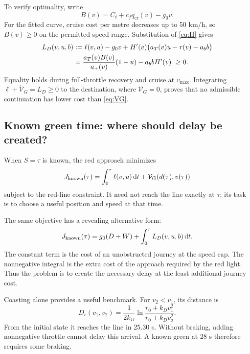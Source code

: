 \documentclass[journal,a4paper,twocolumn]{IEEEtran}
\newcommand{\dd}{\,\mathrm{d}}
\newcommand{\cruise}{\mathrm{cr}}
\begin{document}
To verify optimality, write
\begin{equation}
 B(v)=C_t+c_fq_{\cruise}(v)-g_0v.
\end{equation}
For the fitted curve, cruise cost per metre decreases up to 50 km/h, so $B(v)\ge0$ on the permitted speed range. Substitution of \eqref{eq:H} gives
\begin{align}
 L_D(v,u,b)
 &:=\ell(v,u)-g_0v
 +H'(v)\bigl(a_T(v)u-r(v)-a_bb\bigr)\notag\\
 &=\frac{a_T(v)B(v)}{a_+(v)}(1-u)-a_bbH'(v)
 \ \ge0.
 \label{eq:delayrate}
\end{align}
Equality holds during full-throttle recovery and cruise at $v_{\max}$. Integrating $\ell+\dot{\mathcal V}_G=L_D\ge0$ to the destination, where $\mathcal V_G=0$, proves that no admissible continuation has lower cost than \eqref{eq:VG}.

\subsection{Known green time: where should delay be created?}\label{sec:known}
When $S=\tau$ is known, the red approach minimizes
\begin{equation}
 J_{\rm known}(\tau)=\int_0^\tau\ell(v,u)\dd t
 +\mathcal V_G(d(\tau),v(\tau))
 \label{eq:known}
\end{equation}
subject to the red-line constraint. It need not reach the line exactly at $\tau$; its task is to choose a useful position and speed at that time.

The same objective has a revealing alternative form:
\begin{equation}
 J_{\rm known}(\tau)
 =g_0(D+W)+\int_0^\tau L_D(v,u,b)\dd t.
 \label{eq:knowndelay}
\end{equation}
The constant term is the cost of an unobstructed journey at the speed cap. The nonnegative integral is the extra cost of the approach required by the red light. Thus the problem is to create the necessary delay at the least additional journey cost.

Coasting alone provides a useful benchmark. For $v_2<v_1$, its distance is
\begin{equation}
 D_c(v_1,v_2)=\frac{1}{2k_D}
 \ln\frac{r_0+k_Dv_1^2}{r_0+k_Dv_2^2}.
 \label{eq:coastdist}
\end{equation}
From the initial state it reaches the line in 25.30 s. Without braking, adding nonnegative throttle cannot delay this arrival. A known green at 28 s therefore requires some braking.
\end{document}

